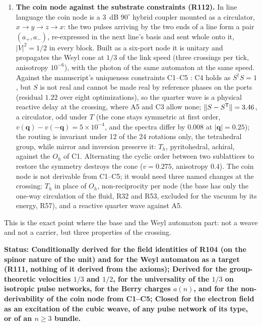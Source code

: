 \documentclass[11pt,a4paper]{article}
\theoremstyle{plain}
\theoremstyle{remark}
\newcommand{\status}[1]{\medskip\noindent\textbf{Status: #1.}\ }
\begin{document}
\begin{enumerate}
of $\sigma_y$: a Hadamard and a quarter wave, $(1, \pm i)/\sqrt2$); the $i$ missing in R105 is
this quarter wave. Known costs, unresolved: fermion doubling (four of the seven zone corners carry
a cone at $\omega = \pi$) and first-order isotropy.
\item \textbf{The coin node against the substrate constraints (R112).} In line language the coin
node is a $3$~dB $90^\circ$ hybrid coupler mounted as a circulator, $x \to y \to z \to x$: the two
pulses arriving by the two ends of a line form a pair $(a_+, a_-)$, re-expressed in the next
line's basis and sent whole onto it, $|V|^2 = 1/2$ in every block. Built as a six-port node it is
unitary and propagates the Weyl cone at $1/3$ of the link speed (three crossings per tick,
anisotropy $10^{-6}$), with the photon of the same automaton at the same speed. Against the
manuscript's uniqueness constraints C1--C5 \cite{dsmodel}: C4 holds as $S^\dagger S = 1$, but
$S$ is not real and cannot be made real by reference phases on the ports (residual $1.22$ over
eight optimizations), so the quarter wave is a physical reactive delay at the crossing, where A5
and C3 allow none; $\|S - S^{\sf T}\| = 3.46$, a circulator, odd under $T$ (the cone stays
symmetric at first order, $v(\mathbf q) - v(-\mathbf q) = 5\times10^{-4}$, and the spectra differ
by $0.008$ at $|\mathbf q| = 0.25$); the routing is invariant under 12 of the 24 rotations only,
the tetrahedral group, while mirror and inversion preserve it: $T_h$, pyritohedral, achiral,
against the $O_h$ of C1. Alternating the cyclic order between two sublattices to restore the
symmetry destroys the cone ($v = 0.275$, anisotropy $0.4$). The coin node is not derivable from
C1--C5; it would need three named changes at the crossing: $T_h$ in place of $O_h$,
non-reciprocity per node (the base has only the one-way circulation of the fluid, R32 and R53,
excluded for the vacuum by its energy, R57), and a reactive quarter wave against A5.
\end{enumerate}

This is the exact point where the base and the Weyl automaton part: not a weave and not a
carrier, but three properties of the crossing.

\status{Conditionally derived for the field identities of R104 (on the spinor nature of the
unit) and for the Weyl automaton as a target (R111, nothing of it derived from the axioms);
Derived for the group-theoretic velocities $1/3$ and $1/2$, for the universality of the $1/3$ on
isotropic pulse networks, for the Berry charges $a(n)$, and for the non-derivability of the coin
node from C1--C5; Closed for the electron field as an excitation of the cubic weave, of any pulse
network of its type, or of an $n \ge 3$ bundle}
\end{document}
